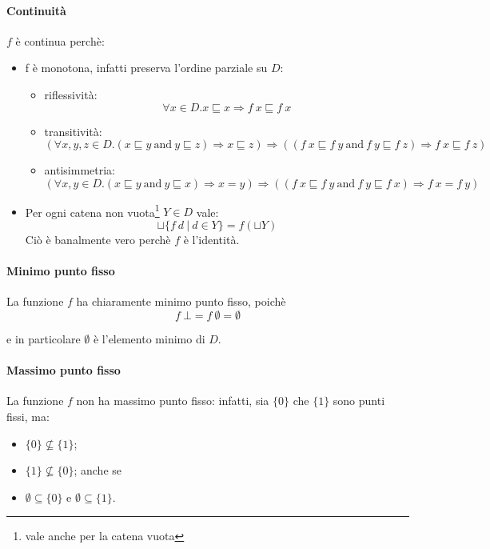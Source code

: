 \paragraph{Continuità} $f$ è continua perchè: 
\begin{itemize}
  \item f è monotona, infatti preserva l'ordine parziale su $D$:
  \begin{itemize}
    \item riflessività:
    $$
      \forall x \in D.x \sqsubseteq x \Rightarrow f\ x \sqsubseteq f\ x
    $$
    \item transitività:
    $$
      (\forall x,y,z \in D.(x \sqsubseteq y\ \text{and}\ y \sqsubseteq z) \Rightarrow
      x \sqsubseteq z)
      \Rightarrow 
      ((f\ x \sqsubseteq f\ y\ \text{and}\ f\ y \sqsubseteq f\ z) \Rightarrow
      f\ x \sqsubseteq f\ z)
    $$
    \item antisimmetria:
     $$
      (\forall x,y \in D.(x \sqsubseteq y\ \text{and}\ y \sqsubseteq x) \Rightarrow
      x = y)
      \Rightarrow 
      ((f\ x \sqsubseteq f\ y\ \text{and}\ f\ y \sqsubseteq f\ x) \Rightarrow
      f\ x = f\ y)
    $$
  \end{itemize}
  \item Per ogni catena non vuota\footnote{vale anche per la catena vuota} $Y \in D$ vale:
    $$ 
      \sqcup\{f\ d\ |\ d \in Y\} = f(\sqcup Y)
    $$
    Ciò è banalmente vero perchè $f$ è l'identità.
\end{itemize}
\paragraph{Minimo punto fisso}
La funzione $f$ ha chiaramente minimo punto fisso, poichè
$$
f\ \bot = f\ \emptyset = \emptyset
$$

e in particolare $\emptyset$ è l'elemento minimo di $D$.

\paragraph{Massimo punto fisso}
La funzione $f$ non ha massimo punto fisso: infatti, sia $\{0\}$ che $\{1\}$
sono punti fissi, ma:
\begin{itemize}
  \item $\{0\} \not\subseteq \{1\}$;
  \item $\{1\} \not\subseteq \{0\}$; anche se
  \item $\emptyset \subseteq \{0\}$ e $\emptyset \subseteq \{1\}$.
\end{itemize}

\let\lt\undefined
